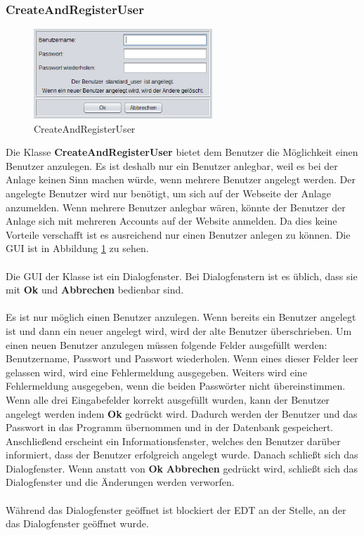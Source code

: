 \subsubsection{CreateAndRegisterUser}
\begin{figure}
\vspace{-20pt}
  \begin{center}
    \includegraphics[width=0.60\textwidth]{Bilder/GUI/CreateUser}
  \end{center}
  \caption{CreateAndRegisterUser}
  \label{CreateAndRegisterUser}
  \vspace{20pt}
\end{figure}
Die Klasse \textbf{CreateAndRegisterUser} bietet dem Benutzer die Möglichkeit einen Benutzer anzulegen. Es ist deshalb nur ein Benutzer anlegbar, weil es bei der Anlage keinen Sinn machen würde, wenn mehrere Benutzer angelegt werden. Der angelegte Benutzer wird nur benötigt, um sich auf der Webseite der Anlage anzumelden. Wenn mehrere Benutzer anlegbar wären, könnte der Benutzer der Anlage sich mit mehreren Accounts auf der Website anmelden. Da dies keine Vorteile verschafft ist es ausreichend nur einen Benutzer anlegen zu können. Die \ac{GUI} ist in Abbildung \ref{CreateAndRegisterUser} zu sehen.
\\ \\ Die \ac{GUI} der Klasse ist ein Dialogfenster. Bei Dialogfenstern ist es üblich, dass sie mit \textbf{Ok} und \textbf{Abbrechen} bedienbar sind.
\\ \\ Es ist nur möglich einen Benutzer anzulegen. Wenn bereits ein Benutzer angelegt ist und dann ein neuer angelegt wird, wird der alte Benutzer überschrieben. Um einen neuen Benutzer anzulegen müssen folgende Felder ausgefüllt werden: Benutzername, Passwort und Passwort wiederholen. Wenn eines dieser Felder leer gelassen wird, wird eine Fehlermeldung ausgegeben. Weiters wird eine Fehlermeldung ausgegeben, wenn die beiden Passwörter nicht übereinstimmen. Wenn alle drei Eingabefelder korrekt ausgefüllt wurden, kann der Benutzer angelegt werden indem \textbf{Ok} gedrückt wird. Dadurch werden der Benutzer und das Passwort in das Programm übernommen und in der Datenbank gespeichert. Anschließend erscheint ein Informationsfenster, welches den Benutzer darüber informiert, dass der Benutzer erfolgreich angelegt wurde. Danach schließt sich das Dialogfenster. Wenn anstatt von \textbf{Ok} \textbf{Abbrechen} gedrückt wird, schließt sich das Dialogfenster und die Änderungen werden verworfen.
\\ \\ Während das Dialogfenster geöffnet ist blockiert der \ac{EDT} an der Stelle, an der das Dialogfenster geöffnet wurde.


